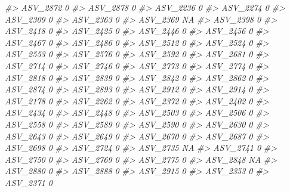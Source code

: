 \documentclass[
]{article}
\newenvironment{Shaded}{\begin{snugshade}}{\end{snugshade}}
\newcommand{\CommentTok}[1]{\textcolor[rgb]{0.56,0.35,0.01}{\textit{#1}}}
\begin{document}
\begin{Shaded}
\begin{Highlighting}[]
\CommentTok{\#\textgreater{} ASV\_2872  0}
\CommentTok{\#\textgreater{} ASV\_2878  0}
\CommentTok{\#\textgreater{} ASV\_2236  0}
\CommentTok{\#\textgreater{} ASV\_2274  0}
\CommentTok{\#\textgreater{} ASV\_2309  0}
\CommentTok{\#\textgreater{} ASV\_2363  0}
\CommentTok{\#\textgreater{} ASV\_2369 NA}
\CommentTok{\#\textgreater{} ASV\_2398  0}
\CommentTok{\#\textgreater{} ASV\_2418  0}
\CommentTok{\#\textgreater{} ASV\_2425  0}
\CommentTok{\#\textgreater{} ASV\_2446  0}
\CommentTok{\#\textgreater{} ASV\_2456  0}
\CommentTok{\#\textgreater{} ASV\_2467  0}
\CommentTok{\#\textgreater{} ASV\_2486  0}
\CommentTok{\#\textgreater{} ASV\_2512  0}
\CommentTok{\#\textgreater{} ASV\_2524  0}
\CommentTok{\#\textgreater{} ASV\_2553  0}
\CommentTok{\#\textgreater{} ASV\_2576  0}
\CommentTok{\#\textgreater{} ASV\_2592  0}
\CommentTok{\#\textgreater{} ASV\_2681  0}
\CommentTok{\#\textgreater{} ASV\_2714  0}
\CommentTok{\#\textgreater{} ASV\_2746  0}
\CommentTok{\#\textgreater{} ASV\_2773  0}
\CommentTok{\#\textgreater{} ASV\_2774  0}
\CommentTok{\#\textgreater{} ASV\_2818  0}
\CommentTok{\#\textgreater{} ASV\_2839  0}
\CommentTok{\#\textgreater{} ASV\_2842  0}
\CommentTok{\#\textgreater{} ASV\_2862  0}
\CommentTok{\#\textgreater{} ASV\_2874  0}
\CommentTok{\#\textgreater{} ASV\_2893  0}
\CommentTok{\#\textgreater{} ASV\_2912  0}
\CommentTok{\#\textgreater{} ASV\_2914  0}
\CommentTok{\#\textgreater{} ASV\_2178  0}
\CommentTok{\#\textgreater{} ASV\_2262  0}
\CommentTok{\#\textgreater{} ASV\_2372  0}
\CommentTok{\#\textgreater{} ASV\_2402  0}
\CommentTok{\#\textgreater{} ASV\_2434  0}
\CommentTok{\#\textgreater{} ASV\_2448  0}
\CommentTok{\#\textgreater{} ASV\_2503  0}
\CommentTok{\#\textgreater{} ASV\_2506  0}
\CommentTok{\#\textgreater{} ASV\_2558  0}
\CommentTok{\#\textgreater{} ASV\_2589  0}
\CommentTok{\#\textgreater{} ASV\_2590  0}
\CommentTok{\#\textgreater{} ASV\_2630  0}
\CommentTok{\#\textgreater{} ASV\_2643  0}
\CommentTok{\#\textgreater{} ASV\_2649  0}
\CommentTok{\#\textgreater{} ASV\_2670  0}
\CommentTok{\#\textgreater{} ASV\_2687  0}
\CommentTok{\#\textgreater{} ASV\_2698  0}
\CommentTok{\#\textgreater{} ASV\_2724  0}
\CommentTok{\#\textgreater{} ASV\_2735 NA}
\CommentTok{\#\textgreater{} ASV\_2741  0}
\CommentTok{\#\textgreater{} ASV\_2750  0}
\CommentTok{\#\textgreater{} ASV\_2769  0}
\CommentTok{\#\textgreater{} ASV\_2775  0}
\CommentTok{\#\textgreater{} ASV\_2848 NA}
\CommentTok{\#\textgreater{} ASV\_2880  0}
\CommentTok{\#\textgreater{} ASV\_2888  0}
\CommentTok{\#\textgreater{} ASV\_2915  0}
\CommentTok{\#\textgreater{} ASV\_2353  0}
\CommentTok{\#\textgreater{} ASV\_2371  0}

\end{Highlighting}
\end{Shaded}
\end{document}
